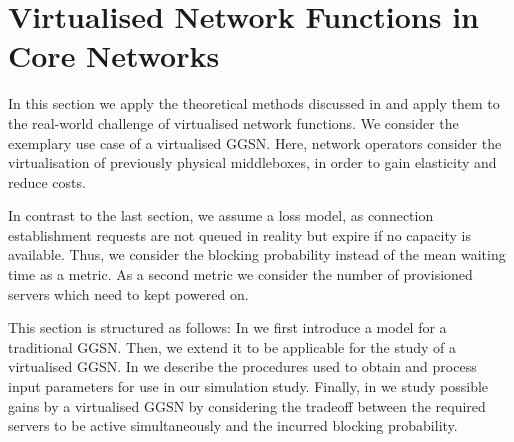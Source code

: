 \section{Virtualised Network Functions in  Core Networks}\label{sec:cloud:virtualized_network_functions}
\newcommand{\blockingprobability}[0]{\ensuremath{p_B}\xspace}
\newcommand{\maxServers}[0]{\ensuremath{S_{\max}}\xspace}
In this section we apply the theoretical methods discussed in  and apply them to the real-world challenge of virtualised network functions.
We consider the exemplary use case of a virtualised \gls{GGSN}.
Here, network operators consider the virtualisation of previously physical middleboxes, in order to gain elasticity and reduce costs.

In contrast to the last section, we assume a loss model, as connection establishment requests are not queued in reality but expire if no capacity is available.
Thus, we consider the blocking probability instead of the mean waiting time as a metric.
As a second metric we consider the number of provisioned servers which need to kept powered on. 

This section is structured as follows:
In  we first introduce a model for a traditional \gls{GGSN}.
Then, we extend it to be applicable for the study of a virtualised \gls{GGSN}.
In  we describe the procedures used to obtain and process input parameters for use in our simulation study.
Finally, in  we study possible gains by a virtualised \gls{GGSN} by considering the tradeoff between the required servers to be active simultaneously and the incurred blocking probability. 



